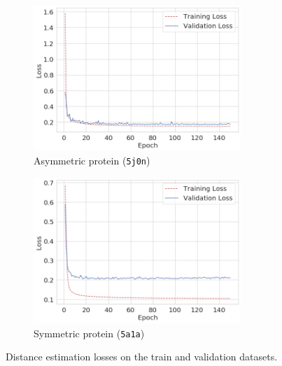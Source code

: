\begin{figure}
    \centering
    \begin{subfigure}[t]{0.45\textwidth}
        \includegraphics[height=5.5cm]{images/de_5j0n.png}
        \caption{Asymmetric protein (\texttt{5j0n})}
        \label{fig:losses-siamese-assym}
    \end{subfigure} \quad \quad
    \begin{subfigure}[t]{0.5\textwidth}
        \includegraphics[height=5.5cm]{images/de_5a1a.png}
        \caption{Symmetric protein (\texttt{5a1a})}
        \label{fig:losses-siamese-sym}
    \end{subfigure}
    \caption{Distance estimation losses on the train and validation datasets.}
    \label{fig:losses-siamese}
\end{figure}

